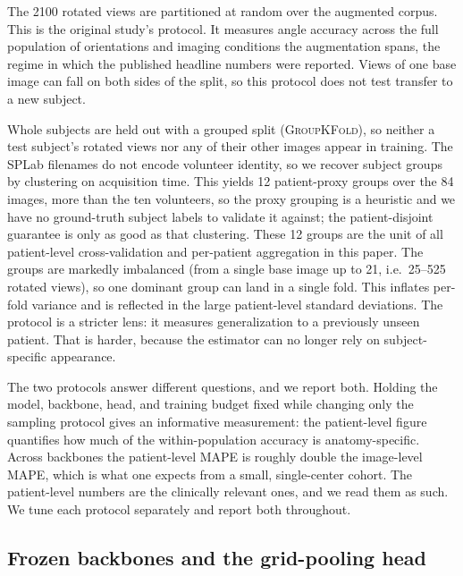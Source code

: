 \begin{description}[leftmargin=1.25em,style=nextline]
  \item[Image-level sampling :] The \num{2100} rotated views are partitioned at random over the augmented corpus. This is the original study's protocol. It measures angle accuracy across the full population of orientations and imaging conditions the augmentation spans, the regime in which the published headline numbers were reported. Views of one base image can fall on both sides of the split, so this protocol does not test transfer to a new subject.
  \item[Patient-level sampling :] Whole subjects are held out with a grouped split (\textsc{GroupKFold}), so neither a test subject's rotated views nor any of their other images appear in training. The SPLab filenames do not encode volunteer identity, so we recover subject groups by clustering on acquisition time. This yields \num{12} patient-proxy groups over the \num{84} images, more than the ten volunteers, so the proxy grouping is a heuristic and we have no ground-truth subject labels to validate it against; the patient-disjoint guarantee is only as good as that clustering. These \num{12} groups are the unit of all patient-level cross-validation and per-patient aggregation in this paper. The groups are markedly imbalanced (from a single base image up to \num{21}, i.e.\ \num{25}--\num{525} rotated views), so one dominant group can land in a single fold. This inflates per-fold variance and is reflected in the large patient-level standard deviations. The protocol is a stricter lens: it measures generalization to a previously unseen patient. That is harder, because the estimator can no longer rely on subject-specific appearance.
\end{description}

The two protocols answer different questions, and we report both. Holding the model, backbone, head, and training budget fixed while changing only the sampling protocol gives an informative measurement: the patient-level figure quantifies how much of the within-population accuracy is anatomy-specific. Across backbones the patient-level MAPE is roughly double the image-level MAPE, which is what one expects from a small, single-center cohort. The patient-level numbers are the clinically relevant ones, and we read them as such. We tune each protocol separately and report both throughout.

\subsection{Frozen backbones and the grid-pooling head}
\label{sec:methods:backbone}

